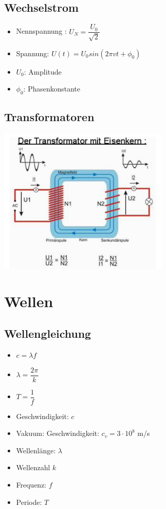 \documentclass[8pt,a4paper]{scrartcl}
\begin{document}
\begin{multicols*}{3}
				\subsection{Wechselstrom}
					\begin{itemize}\itemsep0pt
						\item Nennspannung : $U_{N} = \dfrac{U_{0}}{\sqrt{2}}$
						\item Spannung: $U(t) = U_{0}sin(2\pi vt + \phi_{0})$
						\item $U_{0}$: Amplitude
						\item $\phi_{0}$: Phasenkonstante
					\end{itemize}	
				\subsection{Transformatoren}
					\includegraphics[height=7cm]{img/transformator.png} 
					
			\section{Wellen}
				\subsection{Wellengleichung}
				\begin{multicols*}{2}
					\begin{itemize}\itemsep0pt
						\item $c = \lambda f$
						\item $\lambda = \dfrac{2\pi}{k}$
						\item $T = \dfrac{1}{f}$
						\item Geschwindigkeit: $c$
						\item Vakuum: Geschwindigkeit: $c_{v} = 3\cdot 10^{8}$ m/s 
						\item Wellenlänge: $\lambda$ 
						\item Wellenzahl $k$ 
						\item Frequenz: $f$
						\item Periode: $T$
					\end{itemize}	
					\end{multicols*}
					

\end{multicols*}
\end{document}
